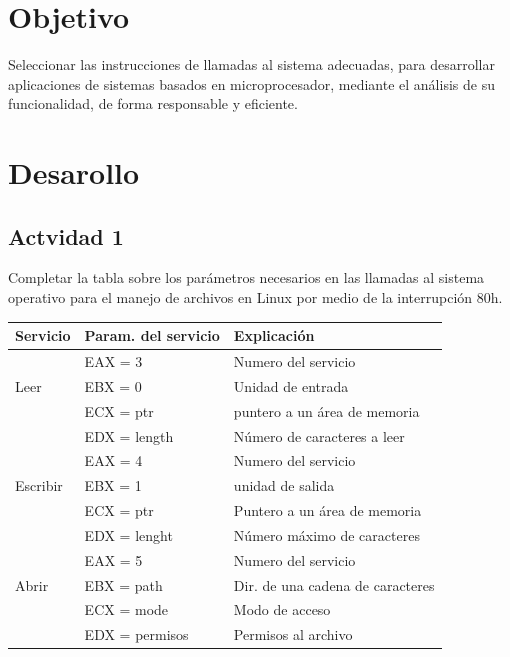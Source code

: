 \documentclass[12pt]{article}
\begin{document}
\section*{Objetivo}
\label{sec:orgbd4fac0}
Seleccionar las instrucciones de llamadas al sistema adecuadas, para 
desarrollar aplicaciones de sistemas basados en microprocesador, 
mediante el análisis de su funcionalidad, de forma responsable y eficiente.

\section*{Desarollo}
\label{sec:org7ccdc2f}
\subsection*{Actvidad 1}
\label{sec:orge9d07a3}
Completar la tabla sobre los parámetros necesarios en las llamadas al
sistema operativo para el manejo de archivos en Linux por medio de la 
interrupción 80h.

\begin{center}
\begin{tabular}{|l|l|l|}
\hline
Servicio & Param. del servicio & Explicación\\
\hline
 & EAX = 3 & Numero del servicio\footnotemark\\
Leer & EBX = 0 & Unidad de entrada\footnotemark\\
 & ECX = ptr & puntero a un área de memoria\\
 & EDX = length & Número de caracteres a leer\\
\hline
 & EAX = 4 & Numero del servicio\\
Escribir & EBX = 1 & unidad de salida\footnotemark\\
 & ECX = ptr & Puntero a un área de memoria\\
 & EDX = lenght & Número máximo de caracteres\\
\hline
 & EAX = 5 & Numero del servicio\\
Abrir & EBX = path & Dir. de una cadena de caracteres\\
 & ECX = mode & Modo de acceso\footnotemark\\
 & EDX = permisos & Permisos al archivo\\
\hline
\end{tabular}
\end{center}
\end{document}
